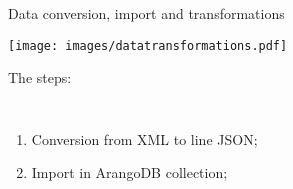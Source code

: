 \documentclass[aspectratio = 169, 15pt, trans]{beamer}
\begin{document}
    \begin{frame}{Data conversion, import and transformations}
        \begin{center}
            \vspace*{-0.1cm}
            \texttt{[image: images/datatransformations.pdf]}
        \end{center}
        
        \vspace*{-0.3cm}
        {\color{darkgray}The steps:}
        \begin{columns}[t]
                \vspace*{-0.3cm}
                \begin{enumerate}
                	\item \small Conversion from XML to line JSON;
                	\item \small Import in ArangoDB collection;
                \end{enumerate}
                

\end{columns}
\end{frame}
\end{document}

